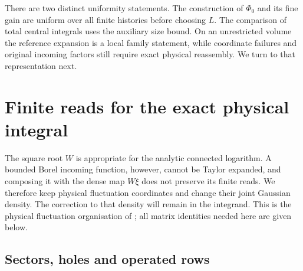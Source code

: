 \documentclass[11pt,reqno]{amsart}
\numberwithin{equation}{section}
\theoremstyle{definition}
\theoremstyle{remark}
\begin{document}
There are two distinct uniformity statements. The construction of
\(\Phi_0\) and its fine gain are uniform over all finite histories
before choosing \(L\). The comparison of total central integrals
uses the auxiliary size bound. On an unrestricted volume the
reference expansion is a local family statement, while coordinate
failures and original incoming factors still require exact
physical reassembly. We turn to that representation next.


\section{Finite reads for the exact physical integral}
\label{sec:physical-selected-Gaussian}

The square root \(W\) is appropriate for the analytic connected
logarithm. A bounded Borel incoming function, however, cannot be
Taylor expanded, and composing it with the dense map \(W\xi\)
does not preserve its finite reads. We therefore keep physical
fluctuation coordinates and change their joint Gaussian density.
The correction to that density will remain in the integrand.
This is the physical fluctuation organisation of
\cite[Sections~27--29, pp.~143--166]{Main}; all matrix identities
needed here are given below.

\subsection{Sectors, holes and operated rows}
\end{document}
